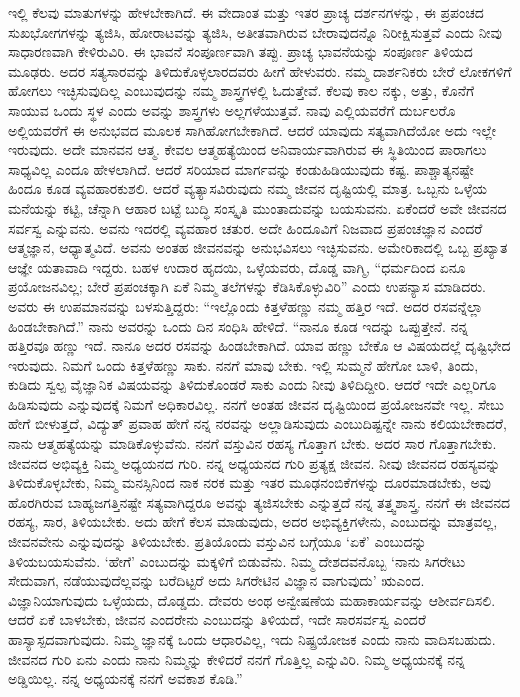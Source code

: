 ಇಲ್ಲಿ ಕೆಲವು ಮಾತುಗಳನ್ನು ಹೇಳಬೇಕಾಗಿದೆ. ಈ ವೇದಾಂತ ಮತ್ತು ಇತರ ಪ್ರಾಚ್ಯ ದರ್ಶನಗಳನ್ನು, ಈ ಪ್ರಪಂಚದ ಸುಖಭೋಗಗಳನ್ನು ತ್ಯಜಿಸಿ, ಹೋರಾಟವನ್ನು ತ್ಯಜಿಸಿ, ಅತೀತವಾಗಿರುವ ಬೇರಾವುದನ್ನೊ ನಿರೀಕ್ಷಿಸುತ್ತವೆ ಎಂದು ನೀವು ಸಾಧಾರಣವಾಗಿ ಕೇಳಿರುವಿರಿ. ಈ ಭಾವನೆ ಸಂಪೂರ್ಣವಾಗಿ ತಪ್ಪು. ಪ್ರಾಚ್ಯ ಭಾವನೆಯನ್ನು ಸಂಪೂರ್ಣ ತಿಳಿಯದ ಮೂಢರು. ಅದರ ಸತ್ಯಸಾರವನ್ನು ತಿಳಿದುಕೊಳ್ಳಲಾರದವರು ಹೀಗೆ ಹೇಳುವರು. ನಮ್ಮ ದಾರ್ಶನಿಕರು ಬೇರೆ ಲೋಕಗಳಿಗೆ ಹೋಗಲು ಇಚ್ಛಿಸುವುದಿಲ್ಲ ಎಂಬುವುದನ್ನು ನಮ್ಮ ಶಾಸ್ತ್ರಗಳಲ್ಲಿ ಓದುತ್ತೇವೆ. ಕೆಲವು ಕಾಲ ನಕ್ಕು, ಅತ್ತು, ಕೊನೆಗೆ ಸಾಯುವ ಒಂದು ಸ್ಥಳ ಎಂದು ಅವನ್ನು ಶಾಸ್ತ್ರಗಳು ಅಲ್ಲಗಳೆಯುತ್ತವೆ. ನಾವು ಎಲ್ಲಿಯವರೆಗೆ ದುರ್ಬಲರೊ ಅಲ್ಲಿಯವರೆಗೆ ಈ ಅನುಭವದ ಮೂಲಕ ಸಾಗಿಹೋಗಬೇಕಾಗಿದೆ. ಆದರೆ ಯಾವುದು ಸತ್ಯವಾಗಿದೆಯೋ ಅದು ಇಲ್ಲೇ ಇರುವುದು. ಅದೇ ಮಾನವನ ಆತ್ಮ. ಕೇವಲ ಆತ್ಮಹತ್ಯೆಯಿಂದ ಅನಿವಾರ್ಯವಾಗಿರುವ ಈ ಸ್ಥಿತಿಯಿಂದ ಪಾರಾಗಲು ಸಾಧ್ಯವಿಲ್ಲ ಎಂದೂ ಹೇಳಲಾಗಿದೆ. ಆದರೆ ಸರಿಯಾದ ಮಾರ್ಗವನ್ನು ಕಂಡುಹಿಡಿಯುವುದು ಕಷ್ಟ. ಪಾಶ್ಚಾತ್ಯನಷ್ಟೇ ಹಿಂದೂ ಕೂಡ ವ್ಯವಹಾರಕುಶಲಿ. ಆದರೆ ವ್ಯತ್ಯಾಸವಿರುವುದು ನಮ್ಮ ಜೀವನ ದೃಷ್ಟಿಯಲ್ಲಿ ಮಾತ್ರ. ಒಬ್ಬನು ಒಳ್ಳೆಯ ಮನೆಯನ್ನು ಕಟ್ಟಿ, ಚೆನ್ನಾಗಿ ಆಹಾರ ಬಟ್ಟೆ ಬುದ್ಧಿ ಸಂಸ್ಕೃತಿ ಮುಂತಾದುವನ್ನು ಬಯಸುವನು. ಏಕೆಂದರೆ ಅವೇ ಜೀವನದ ಸರ್ವಸ್ವ ಎನ್ನುವನು. ಅವನು ಇದರಲ್ಲಿ ವ್ಯವಹಾರ ಚತುರ. ಅದೇ ಹಿಂದೂವಿಗೆ ನಿಜವಾದ ಪ್ರಪಂಚಜ್ಞಾನ ಎಂದರೆ ಆತ್ಮಜ್ಞಾನ, ಆಧ್ಯಾತ್ಮವಿದೆ. ಅವನು ಅಂತಹ ಜೀವನವನ್ನು ಅನುಭವಿಸಲು ಇಚ್ಛಿಸುವನು. ಅಮೇರಿಕಾದಲ್ಲಿ ಒಬ್ಬ ಪ್ರಖ್ಯಾತ ಆಜ್ಞೇ ಯತಾವಾದಿ ಇದ್ದರು. ಬಹಳ ಉದಾರ ಹೃದಯಿ, ಒಳ್ಳೆಯವರು, ದೊಡ್ಡ ವಾಗ್ಮಿ, “ಧರ್ಮದಿಂದ ಏನೂ ಪ್ರಯೋಜನವಿಲ್ಲ; ಬೇರೆ ಪ್ರಪಂಚಕ್ಕಾಗಿ ಏಕೆ ನಿಮ್ಮ ತಲೆಗಳನ್ನು ಕೆಡಿಸಿಕೊಳ್ಳುವಿರಿ” ಎಂದು ಉಪನ್ಯಾಸ ಮಾಡಿದರು. ಅವರು ಈ ಉಪಮಾನವನ್ನು ಬಳಸುತ್ತಿದ್ದರು: “ಇಲ್ಲೊಂದು ಕಿತ್ತಳೆಹಣ್ಣು ನಮ್ಮ ಹತ್ತಿರ ಇದೆ. ಅದರ ರಸವನ್ನೆಲ್ಲಾ ಹಿಂಡಬೇಕಾಗಿದೆ.” ನಾನು ಅವರನ್ನು ಒಂದು ದಿನ ಸಂಧಿಸಿ ಹೇಳಿದೆ. “ನಾನೂ ಕೂಡ ಇದನ್ನು ಒಪ್ಪುತ್ತೇನೆ. ನನ್ನ ಹತ್ತಿರವೂ ಹಣ್ಣು ಇದೆ. ನಾನೂ ಅದರ ರಸವನ್ನು ಹಿಂಡಬೇಕಾಗಿದೆ. ಯಾವ ಹಣ್ಣು ಬೇಕೊ ಆ ವಿಷಯದಲ್ಲೆ ದೃಷ್ಟಿಭೇದ ಇರುವುದು. ನಿಮಗೆ ಒಂದು ಕಿತ್ತಳೆಹಣ್ಣು ಸಾಕು. ನನಗೆ ಮಾವು ಬೇಕು. ಇಲ್ಲಿ ಸುಮ್ಮನೆ ಹೇಗೋ ಬಾಳಿ, ತಿಂದು, ಕುಡಿದು ಸ್ವಲ್ಪ ವೈಜ್ಞಾನಿಕ ವಿಷಯವನ್ನು ತಿಳಿದುಕೊಂಡರೆ ಸಾಕು ಎಂದು ನೀವು ತಿಳಿದಿದ್ದೀರಿ. ಆದರೆ ಇದೇ ಎಲ್ಲರಿಗೂ ಹಿಡಿಸುವುದು ಎನ್ನುವುದಕ್ಕೆ ನಿಮಗೆ ಅಧಿಕಾರವಿಲ್ಲ. ನನಗೆ ಅಂತಹ ಜೀವನ ದೃಷ್ಟಿಯಿಂದ ಪ್ರಯೋಜನವೇ ಇಲ್ಲ. ಸೇಬು ಹೇಗೆ ಬೀಳುತ್ತದೆ, ವಿದ್ಯುತ್​ ಪ್ರವಾಹ ಹೇಗೆ ನನ್ನ ನರವನ್ನು ಅಲ್ಲಾಡಿಸುವುದು ಎಂಬುದಿಷ್ಟನ್ನೇ ನಾನು ಕಲಿಯಬೇಕಾದರೆ, ನಾನು ಆತ್ಮಹತ್ಯೆಯನ್ನು ಮಾಡಿಕೊಳ್ಳುವೆನು. ನನಗೆ ವಸ್ತುವಿನ ರಹಸ್ಯ ಗೊತ್ತಾಗ ಬೇಕು. ಅದರ ಸಾರ ಗೊತ್ತಾಗಬೇಕು. ಜೀವನದ ಅಭಿವ್ಯಕ್ತಿ ನಿಮ್ಮ ಅಧ್ಯಯನದ ಗುರಿ. ನನ್ನ ಅಧ್ಯಯನದ ಗುರಿ ಪ್ರತ್ಯಕ್ಷ ಜೀವನ. ನೀವು ಜೀವನದ ರಹಸ್ಯವನ್ನು ತಿಳಿದುಕೊಳ್ಳಬೇಕು, ನಿಮ್ಮ ಮನಸ್ಸಿನಿಂದ ನಾಕ ನರಕ ಮತ್ತು ಇತರ ಮೂಢನಂಬಿಕೆಗಳನ್ನು ದೂರಮಾಡಬೇಕು, ಅವು ಹೊರಗಿರುವ ಬಾಹ್ಯಜಗತ್ತಿನಷ್ಟೇ ಸತ್ಯವಾಗಿದ್ದರೂ ಅವನ್ನು ತ್ಯಜಿಸಬೇಕು ಎನ್ನುತ್ತದೆ ನನ್ನ ತತ್ತ್ವಶಾಸ್ತ್ರ. ನನಗೆ ಈ ಜೀವನದ ರಹಸ್ಯ, ಸಾರ, ತಿಳಿಯಬೇಕು. ಅದು ಹೇಗೆ ಕೆಲಸ ಮಾಡುವುದು, ಅದರ ಅಭಿವ್ಯಕ್ತಿಗಳೇನು, ಎಂಬುದನ್ನು ಮಾತ್ರವಲ್ಲ, ಜೀವನವೇನು ಎನ್ನುವುದನ್ನು ತಿಳಿಯಬೇಕು. ಪ್ರತಿಯೊಂದು ವಸ್ತುವಿನ ಬಗ್ಗೆಯೂ ‘ಏಕೆ’ ಎಂಬುದನ್ನು ತಿಳಿಯಬಯಸುವೆನು. ‘ಹೇಗೆ’ ಎಂಬುದನ್ನು ಮಕ್ಕಳಿಗೆ ಬಿಡುವೆನು. ನಿಮ್ಮ ದೇಶದವನೊಬ್ಬ ‘ನಾನು ಸಿಗರೇಟು ಸೇದುವಾಗ, ನಡೆಯುವುದೆಲ್ಲವನ್ನು ಬರೆದಿಟ್ಟರೆ ಅದು ಸಿಗರೇಟಿನ ವಿಜ್ಞಾನ ವಾಗುವುದು’ ಋಎಂದ. ವಿಜ್ಞಾನಿಯಾಗುವುದು ಒಳ್ಳೆಯದು, ದೊಡ್ಡದು. ದೇವರು ಅಂಥ ಅನ್ವೇಷಣೆಯ ಮಹಾಕಾರ್ಯವನ್ನು ಆಶೀರ್ವದಿಸಲಿ. ಆದರೆ ಏಕೆ ಬಾಳಬೇಕು, ಜೀವನ ಎಂದರೇನು ಎಂಬುದನ್ನು ತಿಳಿಯದೆ, ಇದೇ ಸಾರಸರ್ವಸ್ವ ಎಂದರೆ ಹಾಸ್ಯಾಸ್ಪದವಾಗುವುದು. ನಿಮ್ಮ ಜ್ಞಾನಕ್ಕೆ ಒಂದು ಆಧಾರವಿಲ್ಲ, ಇದು ನಿಷ್ಪ್ರಯೋಜಕ ಎಂದು ನಾನು ವಾದಿಸಬಹುದು. ಜೀವನದ ಗುರಿ ಏನು ಎಂದು ನಾನು ನಿಮ್ಮನ್ನು ಕೇಳಿದರೆ ನನಗೆ ಗೊತ್ತಿಲ್ಲ ಎನ್ನುವಿರಿ. ನಿಮ್ಮ ಅಧ್ಯಯನಕ್ಕೆ ನನ್ನ ಅಡ್ಡಿಯಿಲ್ಲ. ನನ್ನ ಅಧ್ಯಯನಕ್ಕೆ ನನಗೆ ಅವಕಾಶ ಕೊಡಿ.”

